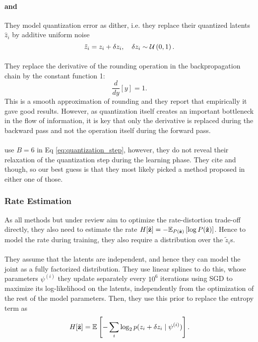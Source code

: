 \paragraph{\cite{balle2016end} and \cite{balle2018variational}}
They model quantization
error as dither, i.e. they replace their quantized latents
$\hat{z}_i$ by additive uniform noise
\[
  \tilde{z}_i = z_i + \delta z_i, \quad \delta z_i \sim \mathcal{U}\left( 0, 1 \right). 
\]

\paragraph{\cite{theis2017lossy}} They replace the derivative of the rounding
operation in the backpropagation chain by the constant function 1:
\[
  \frac{d}{d y} [y] = 1.
\]
This is a smooth approximation of rounding and they report that empirically it
gave good results. However, as quantization itself creates an important
bottleneck in the flow of information, it is key that only the derivative is
replaced during the backward pass and not the operation itself during the
forward pass.

\paragraph{\cite{rippel2017real}} use $B = 6$ in Eq \ref{eq:quantization_step},
however, they do not reveal their relaxation of the quantization step during
the learning phase. They cite \cite{balle2016end} and \cite{toderici2017full}
though, so our best guess is that they most likely picked a method proposed in
either one of those.

\subsubsection{Rate Estimation}
\par
As all methods but \cite{rippel2017real} under review aim to optimize
the rate-distortion trade-off
directly, they also need to estimate the rate $H[\hat{\mathbf{z}}] = -\mathbb{E}_{P(\hat{\mathbf{z}})}\left[ \log
  P(\hat{\mathbf{z}}) \right]$. Hence to model the rate during training,
they also require a distribution over the $\tilde{z}_i$s.

\paragraph{\cite{balle2016end}}
  They assume that the latents are independent, and hence they
  can model the joint as a fully factorized distribution. They use linear
  splines to do this, whose parameters $\psi^{(i)}$ they update separately every
  $10^6$ iterations using SGD to maximize its log-likelihood on the latents,
  independently from the optimization of the rest of the model parameters.
  Then, they use this prior to replace the entropy term as
  \[
   H[\tilde{\mathbf{z}}] = \mathbb{E}_{}\left[ -\sum_i \log_2 p(z_i + \delta z_i \mid \psi^{(i)}) \right].
  \]

